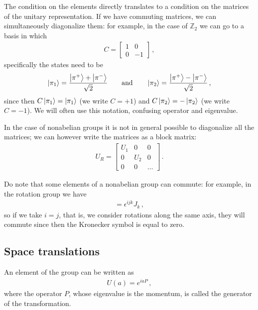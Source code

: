 \documentclass[main.tex]{subfiles}
\begin{document}
The condition on the elements directly translates to a condition on the matrices of the unitary representation. 
If we have commuting matrices, we can simultaneously diagonalize them: for example, in the case of \(\mathbb{Z}_{2}\) we can go to a basis in which 
%
\begin{align}
C = \left[\begin{array}{cc}
1 & 0 \\ 
0 & -1
\end{array}\right]
\,,
\end{align}
%
specifically the states need to be 
%
\begin{align}
\ket{\pi_{1}} = \frac{\ket{\pi^{+}} + \ket{\pi^{-}}}{\sqrt{2}} 
\qquad \text{and} \qquad
\ket{\pi_{2}} = \frac{\ket{\pi^{+}} - \ket{\pi^{-}}}{\sqrt{2}}
\,,
\end{align}
%
since then \(C \ket{\pi_1 } = \ket{\pi_1 }\) (we write \(C = +1\)) and \(C \ket{\pi_{2}} = - \ket{\pi_2 }\) (we write \(C = -1\)). 
We will often use this notation, confusing operator and eigenvalue.

In the case of nonabelian groups it is not in general possible to diagonalize all the matrices; we can however write the matrices as a block matrix: 
%
\begin{align}
U_{R} = \left[\begin{array}{ccc}
U_1  & 0 & 0 \\ 
0 & U_2  & 0 \\ 
0 & 0 & \dots
\end{array}\right] 
\,.
\end{align}

Do note that some elements of a nonabelian group can commute: for example, in the rotation group we have 
%
\begin{align}
[J^{i}, J^{j}] = \epsilon^{ijk} J_{k}
\,,
\end{align}
%
so if we take \(i = j\), that is, we consider rotations along the same axis, they will commute since then the Kronecker symbol is equal to zero. 

\subsection{Space translations}

An element of the group can be written as 
%
\begin{align}
U(a) = e^{i a P }
\,,
\end{align}
%
where the operator \(P\), whose eigenvalue is the momentum, is called the generator of the transformation. 
\end{document}

